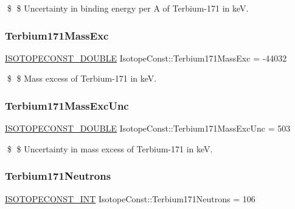 \$ \$ Uncertainty in binding energy per A of Terbium-\/171 in keV. \mbox{\label{group___isotope_const-_terbium-_tb171_gacfc7ffd1c04622ebe53191df4366a847}} 
\subsubsection{\texorpdfstring{Terbium171\+Mass\+Exc}{Terbium171MassExc}}
{\footnotesize\ttfamily \mbox{\hyperlink{group___isotope_const-_macros_ga8f45a7272ce02c0b4c65c44636ed719a}{I\+S\+O\+T\+O\+P\+E\+C\+O\+N\+S\+T\+\_\+\+D\+O\+U\+B\+LE}} Isotope\+Const\+::\+Terbium171\+Mass\+Exc = -\/44032}

\$ \$ Mass excess of Terbium-\/171 in keV. \mbox{\label{group___isotope_const-_terbium-_tb171_gace40ead2e0f0d51db65f7831ff913a5a}} 
\subsubsection{\texorpdfstring{Terbium171\+Mass\+Exc\+Unc}{Terbium171MassExcUnc}}
{\footnotesize\ttfamily \mbox{\hyperlink{group___isotope_const-_macros_ga8f45a7272ce02c0b4c65c44636ed719a}{I\+S\+O\+T\+O\+P\+E\+C\+O\+N\+S\+T\+\_\+\+D\+O\+U\+B\+LE}} Isotope\+Const\+::\+Terbium171\+Mass\+Exc\+Unc = 503}

\$ \$ Uncertainty in mass excess of Terbium-\/171 in keV. \mbox{\label{group___isotope_const-_terbium-_tb171_ga23551de5e848a8c07e4931f40a9dd895}} 
\subsubsection{\texorpdfstring{Terbium171\+Neutrons}{Terbium171Neutrons}}
{\footnotesize\ttfamily \mbox{\hyperlink{group___isotope_const-_macros_ga5f18360b3e99483a35c32d789e62621c}{I\+S\+O\+T\+O\+P\+E\+C\+O\+N\+S\+T\+\_\+\+I\+NT}} Isotope\+Const\+::\+Terbium171\+Neutrons = 106}


